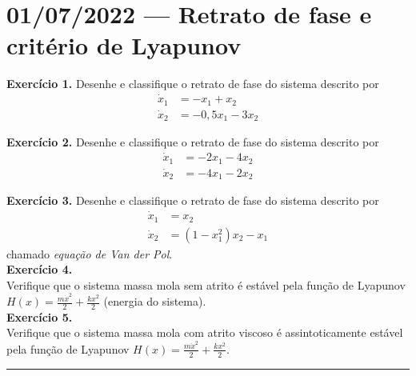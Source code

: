 \section*{01/07/2022 --- Retrato de fase e critério de Lyapunov}
\noindent\textbf{\sffamily Exercício 1.}
	Desenhe e classifique o retrato de fase do sistema descrito por 
	\begin{align*}
		\dot{x}_1 &= -x_1 + x_2 \\
		\dot{x}_2 &= -0,5x_1 -3x_2
	\end{align*}
	
	\noindent\textbf{\sffamily Exercício 2.}
	Desenhe e classifique o retrato de fase do sistema descrito por 
	\begin{align*}
		\dot{x}_1 &= -2x_1 - 4x_2 \\
		\dot{x}_2 &= -4x_1 -2x_2
	\end{align*}
	
	\noindent\textbf{\sffamily Exercício 3.}
	Desenhe e classifique o retrato de fase do sistema descrito por 
	\begin{align*}
		\dot{x}_1 &= x_2 \\
		\dot{x}_2 &= (1-x_1^2)x_2 - x_1
	\end{align*}
	chamado \emph{equação de Van der Pol}. \\
	
	\noindent\textbf{\sffamily Exercício 4.} \\
	Verifique que o sistema massa mola sem atrito é estável pela função de Lyapunov 
	$H(x) = \frac{m\dot{x}^2}{2} + \frac{kx^2}{2}$ (energia do sistema). \\
	
	\noindent\textbf{\sffamily Exercício 5.} \\
	Verifique que o sistema massa mola com atrito viscoso é assintoticamente estável pela função de Lyapunov 
	$H(x) = \frac{m\dot{x}^2}{2} + \frac{kx^2}{2}$. \\
	\rule{\textwidth}{0.5pt} 
	
